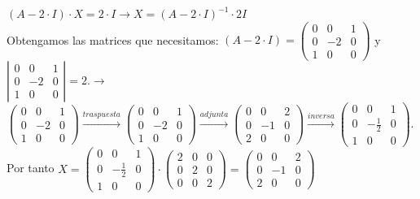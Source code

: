 \documentclass[addpoints,spanish, 12pt,a4paper]{exam}
\begin{document}
\begin{questions}
\begin{parts}
\begin{solution}
$(A-2\cdot I )\cdot X = 2\cdot I \to X=(A-2\cdot I)^{-1}\cdot 2I$\\Obtengamos las matrices que necesitamos: $(A-2\cdot I )=\left(\begin{matrix}0 & 0 & 1\\0 & -2 & 0\\1 & 0 & 0\end{matrix}\right)$ y $\left|\begin{matrix}0 & 0 & 1\\0 & -2 & 0\\1 & 0 & 0\end{matrix}\right|=2$.$\rightarrow$ $\left(\begin{matrix}0 & 0 & 1\\0 & -2 & 0\\1 & 0 & 0\end{matrix}\right)\xrightarrow{traspuesta}\left(\begin{matrix}0 & 0 & 1\\0 & -2 & 0\\1 & 0 & 0\end{matrix}\right)\xrightarrow{adjunta}\left(\begin{matrix}0 & 0 & 2\\0 & -1 & 0\\2 & 0 & 0\end{matrix}\right)\xrightarrow{inversa}\left(\begin{matrix}0 & 0 & 1\\0 & - \frac{1}{2} & 0\\1 & 0 & 0\end{matrix}\right)$.\\Por tanto $X=\left(\begin{matrix}0 & 0 & 1\\0 & - \frac{1}{2} & 0\\1 & 0 & 0\end{matrix}\right)\cdot\left(\begin{matrix}2 & 0 & 0\\0 & 2 & 0\\0 & 0 & 2\end{matrix}\right)=\left(\begin{matrix}0 & 0 & 2\\0 & -1 & 0\\2 & 0 & 0\end{matrix}\right)$
\end{solution}
\end{parts}

\addpoints



\end{questions}
\end{document}

